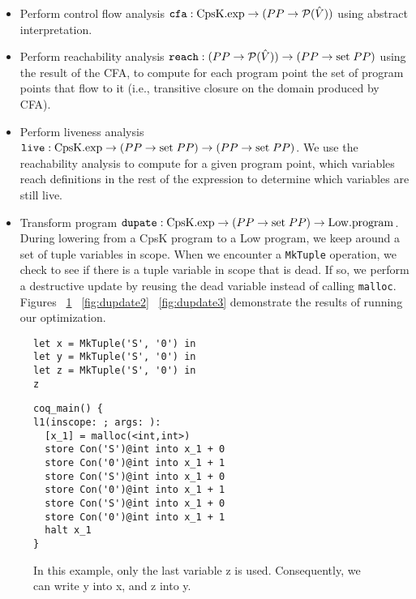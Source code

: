 \documentclass{article}
\begin{document}
\begin{itemize}
\item Perform control flow analysis ${\tt cfa} : {\rm CpsK.exp} \rightarrow (PP \rightarrow \mathcal{P}(\hat{V}))$ using abstract interpretation. 
\item Perform reachability analysis ${\tt reach} : (PP \rightarrow \mathcal{P}(\hat{V})) \rightarrow (PP \rightarrow {\rm set} \; PP)$ using the result of the CFA, to compute for each program point the set of program points that flow to it (i.e., transitive closure on the domain produced by CFA).
\item Perform liveness analysis ${\tt live} : {\rm CpsK.exp} \rightarrow (PP \rightarrow {\rm set} \; PP) \rightarrow (PP \rightarrow {\rm set} \; PP)$. We use the reachability analysis to compute for a given program point, which variables reach definitions in the rest of the expression to determine which variables are still live. 
\item Transform program ${\tt dupate} : {\rm CpsK.exp} \rightarrow (PP \rightarrow {\rm set} \; PP) \rightarrow {\rm Low.program}$. During lowering from a CpsK program to a Low program, we keep around a set of tuple variables in scope. When we encounter a {\tt MkTuple} operation, we check to see if there is a tuple variable in scope that is dead. If so, we perform a destructive update by reusing the dead variable instead of calling {\tt malloc}. Figures ~\ref{fig:dupdate1} ~\ref{fig:dupdate2} ~\ref{fig:dupdate3} demonstrate the results of running our optimization.
\end{itemize}

\begin{figure}
\centering
\begin{minipage}[t]{.4\textwidth}
\begin{lstlisting}
let x = MkTuple('S', '0') in
let y = MkTuple('S', '0') in
let z = MkTuple('S', '0') in
z
\end{lstlisting}
\end{minipage}
\hspace{20pt}
\begin{minipage}[t]{.4\textwidth}
\begin{lstlisting}
coq_main() {
l1(inscope: ; args: ):
  [x_1] = malloc(<int,int>)
  store Con('S')@int into x_1 + 0
  store Con('0')@int into x_1 + 1
  store Con('S')@int into x_1 + 0
  store Con('0')@int into x_1 + 1
  store Con('S')@int into x_1 + 0
  store Con('0')@int into x_1 + 1
  halt x_1
}
\end{lstlisting}
\end{minipage}
\caption{In this example, only the last variable z is
   used. Consequently, we can write y into x, and z into y. }
\label{fig:dupdate1}
\end{figure}
\end{document}
